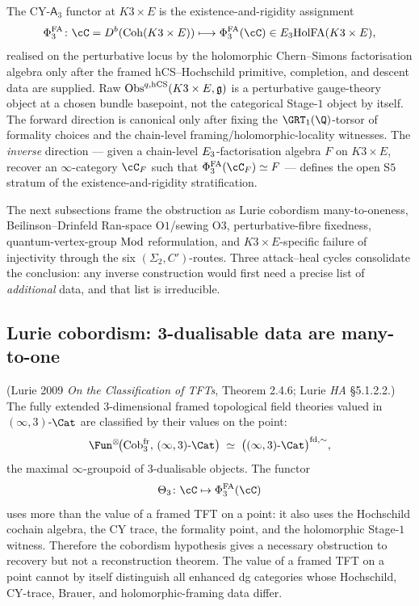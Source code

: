 The CY-$\mathsf A_3$ functor at $K3\times E$ is the existence-and-rigidity
assignment
\begin{equation}
\label{eq:agent08-fwd-functor}
 \PhiFA_3 \colon
 \cC = D^b(\Coh(K3\times E))
 \longmapsto
 \PhiFA_3(\cC) \in \Ethree\HolFA(K3\times E),
\end{equation}
realised on the perturbative locus by the holomorphic Chern--Simons
factorisation algebra only after the framed hCS--Hochschild primitive,
completion, and descent data are supplied. Raw
$\mathrm{Obs}^{q,\mathrm{hCS}}(K3\times E,\mathfrak{g})$ is a perturbative gauge-theory
object at a chosen bundle basepoint, not the categorical Stage-$1$
object by itself. The forward direction is canonical only after fixing
the $\GRT_1(\Q)$-torsor of formality choices and the chain-level
framing/holomorphic-locality witnesses. The
\emph{inverse} direction --- given a chain-level
$E_3$-factorisation algebra $F$ on $K3\times E$, recover an
$\infty$-category $\cC_F$ such that $\PhiFA_3(\cC_F)\simeq F$ ---
defines the open S$5$ stratum of the existence-and-rigidity
stratification.

The next subsections frame the obstruction as Lurie cobordism many-to-oneness,
Beilinson--Drinfeld Ran-space O$1$/sewing O$3$, perturbative-fibre fixedness,
quantum-vertex-group $\mathrm{Mod}$ reformulation, and $K3\times E$-specific failure
of injectivity through the six $(\Sigma_2,C')$-routes. Three attack--heal
cycles consolidate the conclusion: any inverse construction would first
need a precise list of \emph{additional} data, and that list is
irreducible.

\subsection{Lurie cobordism: 3-dualisable data are many-to-one}
\label{wn:subsec:agent08-lurie}

\begin{theorem}
\label{thm:agent08-lurie-many-to-one}
\ClaimStatusTheorem{} \textup{(Lurie 2009 \emph{On the Classification of TFTs},
Theorem 2.4.6; Lurie \emph{HA} \S5.1.2.2.)} The fully extended
$3$-dimensional framed topological field theories valued in
$(\infty,3)$-$\Cat$ are classified by their values on the point:
\[
\Fun^{\otimes}\!\bigl(\Cob_3^{\mathrm{fr}},\,(\infty,3)\textup{-}\Cat\bigr)
\;\simeq\;
\bigl((\infty,3)\textup{-}\Cat\bigr)^{\mathrm{fd},\sim},
\]
the maximal $\infty$-groupoid of $3$-dualisable objects. The functor
\[
\Theta_3 \colon \cC \mapsto \PhiFA_3(\cC)
\]
uses more than the value of a framed TFT on a point: it also uses the
Hochschild cochain algebra, the CY trace, the formality point, and the
holomorphic Stage-$1$ witness. Therefore the cobordism hypothesis gives
a necessary obstruction to recovery but not a reconstruction theorem.
The value of a framed TFT on a point cannot by itself distinguish all
enhanced dg categories whose Hochschild, CY-trace, Brauer, and
holomorphic-framing data differ.
\end{theorem}

